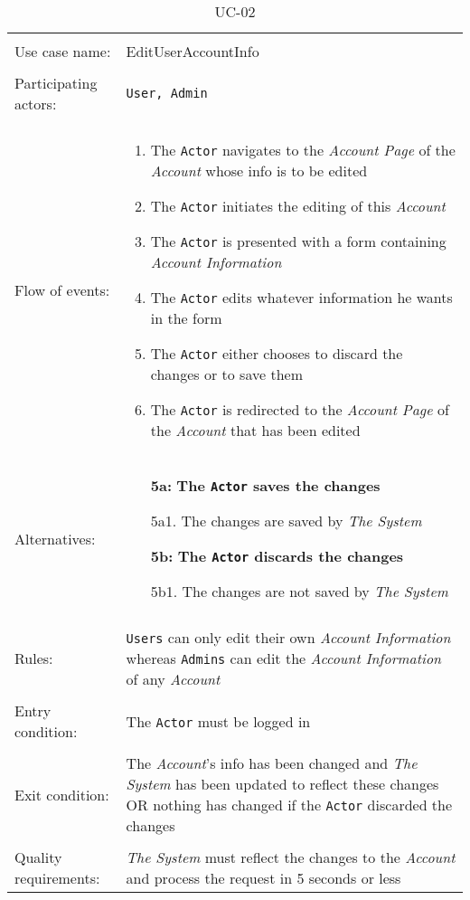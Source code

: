 
\label{sec:Use Cases}

\noindent
\begin{table}[h!]
\caption{UC-02}
\label{UC-02}
\centering
\begin{tabular}{ l  p{8cm} } 
\hline 
\\
Use case name:  & EditUserAccountInfo   \\   \hline    
\\            
Participating actors:  & \texttt{User, \texttt{Admin}} \\   \hline   
\\      
Flow of events: & \begin{enumerate}
\item{The \texttt{Actor} navigates to the \textit{Account Page} of the \textit{Account} whose info is to be edited}
\item{The \texttt{Actor} initiates the editing of this \textit{Account}}
\item{The \texttt{Actor} is presented with a form containing \textit{Account Information}}
\item{The \texttt{Actor} edits whatever information he wants in the form}
\item{The \texttt{Actor} either chooses to discard the changes or to save them}
\item{The \texttt{Actor} is redirected to the \textit{Account Page} of the \textit{Account} that has been edited}
\end{enumerate}
\\
Alternatives: & \begin{itemize}
\item[\textbf{5a:}]{\textbf{The \texttt{Actor} saves the changes}}
\item[]  5a1. The changes are saved by \textit{The System}
\item[\textbf{5b:}]\textbf{The \texttt{Actor} discards the changes}
\item[]  5b1. The changes are not saved by \textit{The System}
\end{itemize}
\\ \hline
\\
Rules: & \texttt{Users} can only edit their own \textit{Account Information} whereas \texttt{Admins} can edit the \textit{Account Information} of any  \textit{Account}
\\   \hline 
\\
Entry condition: & The \texttt{Actor} must be logged in \\ \hline
\\
Exit condition: & The \textit{Account}'s info has been changed and \textit{The System} has been updated to reflect these changes OR
nothing has changed if the \texttt{Actor} discarded the changes\\ \hline
\\
Quality requirements: & \textit{The System} must reflect the changes to the \textit{Account} and process the request in 5 seconds or less \\ \hline  
\end{tabular}
\end{table}

